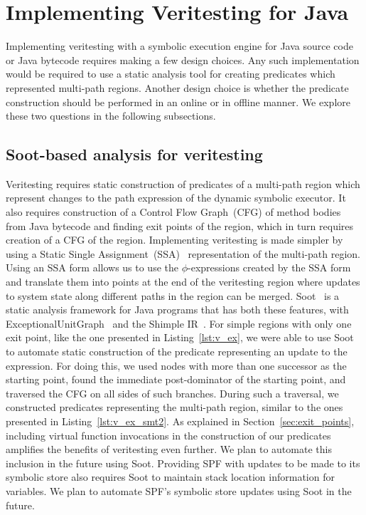 \section{Implementing Veritesting for Java}
Implementing veritesting with a symbolic execution engine for Java
source code or Java bytecode requires making a few design choices.
%
Any such implementation would be required to use a static analysis tool
for creating predicates which represented multi-path regions.
%
Another design choice is whether the predicate construction should be
performed in an online or in offline manner.
%
We explore these two questions in the following subsections.
%
\subsection{Soot-based analysis for veritesting}
%
Veritesting requires static construction of
predicates of a multi-path region which represent changes to the path expression of the dynamic
symbolic executor.
%
It also requires construction of a Control Flow Graph~(CFG) of method bodies
from Java bytecode and finding exit points of the region, which in turn
requires creation of a CFG of the region.
%
Implementing veritesting is made simpler by using a Static Single
Assignment~(SSA)~\cite{ssa} representation of the multi-path region.
%
Using an SSA form allows us to use the $\phi$-expressions created by the
SSA form and translate them into points at the end of the veritesting
region where updates to system state along different paths in the region
can be merged.
%
Soot~\cite{soot} is a static analysis framework for Java programs that
has both these features, with
ExceptionalUnitGraph~\cite{exceptionalunitgraph} and the Shimple
IR~\cite{shimple}.
%
For simple regions with only one exit point, like the one presented in Listing~\ref{lst:v_ex}, we
were able to use Soot to automate static construction of the predicate representing
an update to the expression. 
%
For doing this, we used nodes with more than one successor as the
starting point, found the immediate post-dominator of the starting
point, and traversed the CFG on all sides of such branches.
%
During such a traversal, we constructed predicates representing the
multi-path region, similar to the ones presented in
Listing~\ref{lst:v_ex_smt2}.
%
As explained in Section~\ref{sec:exit_points}, including virtual
function invocations in the construction of our predicates amplifies the
benefits of veritesting even further.
%
We plan to automate this inclusion in the future using Soot.
%
Providing SPF with updates to be made to its symbolic store also
requires Soot to maintain stack location information for variables.
%
We plan to automate SPF\rq s symbolic store updates using Soot in the
future.
%
